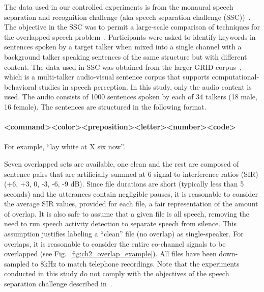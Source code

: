 The data used in our controlled experiments is from the monaural speech separation and recognition challenge (aka speech separation challenge (SSC))~\cite{cooke20101}. 
The objective in the SSC was to permit a large-scale comparison of techniques for the overlapped speech problem~\cite{cooke20101}. 
Participants were asked to identify keywords in sentences spoken by a target talker when mixed into a single channel with a background talker speaking sentences of the same structure but with different content. 
The data used in SSC was obtained from the larger GRID corpus~\cite{cooke_JASA_SSCD}, which is a multi-talker audio-visual sentence corpus that supports computational-behavioral studies in speech perception. 
In this study, only the audio content is used. 
The audio consists of 1000 sentences spoken by each of 34 talkers (18 male, 16 female). The sentences are structured in the following format.
\\\\
{\small \bf \textless command\textgreater\textless color\textgreater\textless preposition\textgreater\textless letter\textgreater\textless number\textgreater\textless code\textgreater}
\\\\
For example, ``lay white at X six now''.

Seven overlapped sets are available, one clean and the rest are composed of sentence pairs that are artificially summed at 6 signal-to-interference ratios (SIR) (+6, +3, 0, -3, -6, -9 dB). 
Since file durations are short (typically less than 5 seconds) and the utterances contain negligible pauses, it is reasonable to consider the average SIR values, provided for each file, a fair representation of the amount of overlap. 
It is also safe to assume that a given file is all speech, removing the need to run speech activity detection to separate speech from silence. 
This assumption justifies labeling a ``clean'' file (no overlap) as single-speaker. 
For overlaps, it is reasonable to consider the entire co-channel signals to be overlapped (see Fig.~\ref{fig:ch2_overlap_example}). 
All files have been down-sampled to 8kHz to match telephone recordings. 
Note that the experiments conducted in this study do not comply with the objectives of the speech separation challenge described in~\cite{SSC_link}. 

